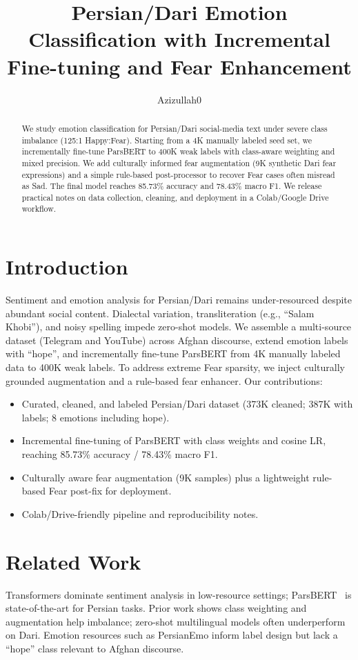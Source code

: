 \documentclass[11pt]{article}
\title{Persian/Dari Emotion Classification with Incremental Fine-tuning and Fear Enhancement}
\author{Azizullah0}
\date{}
\begin{document}
\maketitle

\begin{abstract}
We study emotion classification for Persian/Dari social-media text under severe class imbalance (125:1 Happy:Fear). Starting from a 4K manually labeled seed set, we incrementally fine-tune ParsBERT to 400K weak labels with class-aware weighting and mixed precision. We add culturally informed fear augmentation (9K synthetic Dari fear expressions) and a simple rule-based post-processor to recover Fear cases often misread as Sad. The final model reaches 85.73\% accuracy and 78.43\% macro F1. We release practical notes on data collection, cleaning, and deployment in a Colab/Google Drive workflow.
\end{abstract}

\section{Introduction}
Sentiment and emotion analysis for Persian/Dari remains under-resourced despite abundant social content. Dialectal variation, transliteration (e.g., ``Salam Khobi''), and noisy spelling impede zero-shot models. We assemble a multi-source dataset (Telegram and YouTube) across Afghan discourse, extend emotion labels with ``hope'', and incrementally fine-tune ParsBERT from 4K manually labeled data to 400K weak labels. To address extreme Fear sparsity, we inject culturally grounded augmentation and a rule-based fear enhancer. Our contributions:
\begin{itemize}[leftmargin=*]
    \item Curated, cleaned, and labeled Persian/Dari dataset (373K cleaned; 387K with labels; 8 emotions including hope).
    \item Incremental fine-tuning of ParsBERT with class weights and cosine LR, reaching 85.73\% accuracy / 78.43\% macro F1.
    \item Culturally aware fear augmentation (9K samples) plus a lightweight rule-based Fear post-fix for deployment.
    \item Colab/Drive-friendly pipeline and reproducibility notes.
\end{itemize}

\section{Related Work}
Transformers dominate sentiment analysis in low-resource settings; ParsBERT~\cite{farahani2021parsbert} is state-of-the-art for Persian tasks. Prior work shows class weighting and augmentation help imbalance; zero-shot multilingual models often underperform on Dari. Emotion resources such as PersianEmo inform label design but lack a ``hope'' class relevant to Afghan discourse.
\end{document}
